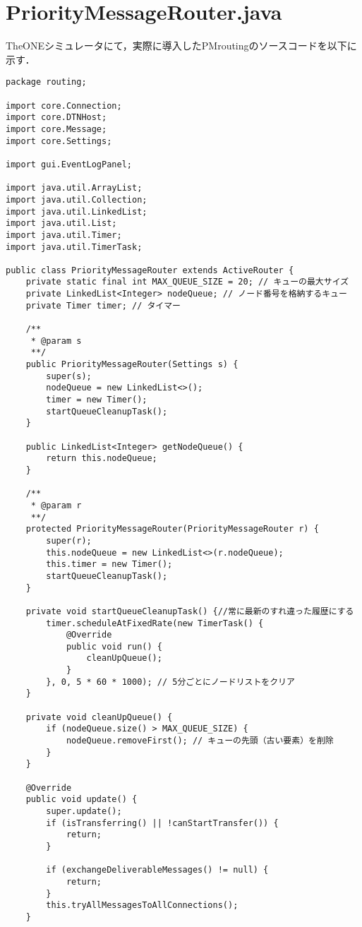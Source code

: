 \documentclass[11pt]{icsthesis}
\begin{document}
\section{PriorityMessageRouter.java}
TheONEシミュレータにて，実際に導入したPMroutingのソースコードを以下に示す．
\begin{framed}
\begin{verbatim}
package routing;

import core.Connection;
import core.DTNHost;
import core.Message;
import core.Settings;

import gui.EventLogPanel;

import java.util.ArrayList;
import java.util.Collection;
import java.util.LinkedList;
import java.util.List;
import java.util.Timer;
import java.util.TimerTask;

public class PriorityMessageRouter extends ActiveRouter {
    private static final int MAX_QUEUE_SIZE = 20; // キューの最大サイズ
    private LinkedList<Integer> nodeQueue; // ノード番号を格納するキュー
    private Timer timer; // タイマー

    /**
     * @param s
     **/
    public PriorityMessageRouter(Settings s) {
        super(s);
        nodeQueue = new LinkedList<>();
        timer = new Timer();
        startQueueCleanupTask();
    }

    public LinkedList<Integer> getNodeQueue() {
        return this.nodeQueue;
    }

    /**
     * @param r
     **/
    protected PriorityMessageRouter(PriorityMessageRouter r) {
        super(r);
        this.nodeQueue = new LinkedList<>(r.nodeQueue);
        this.timer = new Timer();
        startQueueCleanupTask();
    }

    private void startQueueCleanupTask() {//常に最新のすれ違った履歴にする
        timer.scheduleAtFixedRate(new TimerTask() {
            @Override
            public void run() {
                cleanUpQueue();
            }
        }, 0, 5 * 60 * 1000); // 5分ごとにノードリストをクリア
    }

    private void cleanUpQueue() {
        if (nodeQueue.size() > MAX_QUEUE_SIZE) {
            nodeQueue.removeFirst(); // キューの先頭（古い要素）を削除
        }
    }

    @Override
    public void update() {
        super.update();
        if (isTransferring() || !canStartTransfer()) {
            return;
        }

        if (exchangeDeliverableMessages() != null) {
            return;
        }
        this.tryAllMessagesToAllConnections();
    }


\end{verbatim}
\end{framed}
\end{document}
